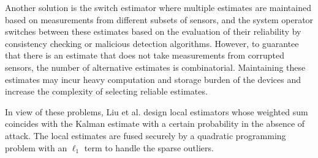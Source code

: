 \documentclass{ieeetrans}   %
\begin{document}
Another solution is the switch estimator\cite{yorie}\cite{luTAC2019} where multiple estimates are maintained based on measurements from different subsets of sensors, and the system operator switches between these estimates based on the evaluation of their reliability by consistency checking or malicious detection algorithms. However, to guarantee that there is an estimate that does not take measurements from corrupted sensors, the number of alternative estimates is combinatorial. Maintaining these estimates may incur heavy computation and storage burden of the devices and increase the complexity of selecting reliable estimates.

In view of these problems, Liu et al. \cite{liuxinghua-TAC2020} design local estimators whose weighted sum coincides with the Kalman estimate with a certain probability in the absence of attack. The local estimates are fused securely by a quadratic programming problem with an $\ell_1$ term to handle the sparse outliers. 
\end{document}
